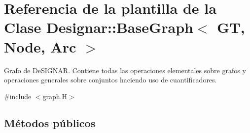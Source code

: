 \hypertarget{class_designar_1_1_base_graph}{}\section{Referencia de la plantilla de la Clase Designar\+:\+:Base\+Graph$<$ GT, Node, Arc $>$}
\label{class_designar_1_1_base_graph}


Grafo de De\+S\+I\+G\+N\+AR. Contiene todas las operaciones elementales sobre grafos y operaciones generales sobre conjuntos haciendo uso de cuantificadores.  




{\ttfamily \#include $<$graph.\+H$>$}

\subsection*{Métodos públicos}

